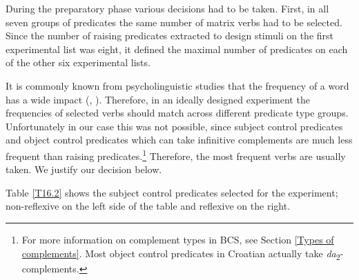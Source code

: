 During the preparatory phase various decisions had to be taken. First, in all seven groups of predicates the same number of matrix verbs had to be selected. Since the number of raising predicates extracted to design stimuli on the first experimental list was eight, it defined the maximal number of predicates on each of the other six experimental lists.

It is commonly known from psycholinguistic studies that the frequency of a word has a wide impact (\citealt[][]{BMR16}, \citealt{BMK18}). Therefore, in an ideally designed experiment the frequencies of selected verbs should match across different predicate type groups. Unfortunately in our case this was not possible, since subject control predicates and object control predicates which can take infinitive complements are much less frequent than raising predicates.\footnote{For more information on complement types in BCS, see Section \ref{Types of complements}. Most object control predicates in Croatian actually take \textit{da}\textsubscript{2}-complements.} Therefore, the most frequent verbs are usually taken. We justify our decision below. 

Table \ref{T16.2} shows the subject control predicates selected for the experiment; non-reflexive on the left side of the table and reflexive on the right. 

\begin{table}
\caption{Subject control predicates selected for the acceptability judgment experiment\label{T16.2}}
\end{table}


